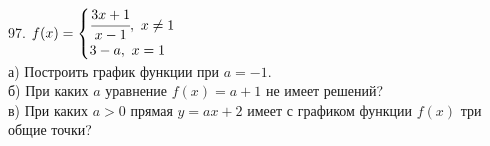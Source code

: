 97. $f(x)=\begin{cases} \cfrac{3x+1}{x-1},\ x\neq1\\3-a,\ x=1 \end{cases}$\\
а) Построить график функции при $a=-1.$\\
б) При каких $a$ уравнение $f(x)=a+1$ не имеет решений?\\
в) При каких $a>0$ прямая $y=ax+2$ имеет с графиком функции $f(x)$ три общие точки?\\
